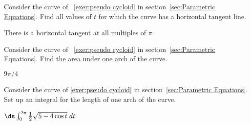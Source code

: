 \begin{enumialphparenastyle}

\begin{ex}
 Consider the curve of ~\ref{exer:pseudo cycloid} in 
section~\ref{sec:Parametric Equations}. Find all values of
$t$ for which the curve has a horizontal tangent line.
\begin{sol}
 There is a horizontal tangent at all multiples of $\pi$.
\end{sol}
\end{ex}

\begin{ex}
 Consider the curve of ~\ref{exer:pseudo cycloid} in 
section~\ref{sec:Parametric Equations}. Find the area under
one arch of the curve.
\begin{sol}
 $9\pi/4$
\end{sol}
\end{ex}

\begin{ex}
 Consider the curve of  \ref{exer:pseudo cycloid} in 
section~\ref{sec:Parametric Equations}. Set up an integral
for the length of one arch of the curve.
\begin{sol}
 $\ds \int_0^{2\pi}{1\over2} \sqrt{5-4\cos t}\;dt$
\end{sol}
\end{ex}


\end{enumialphparenastyle}
